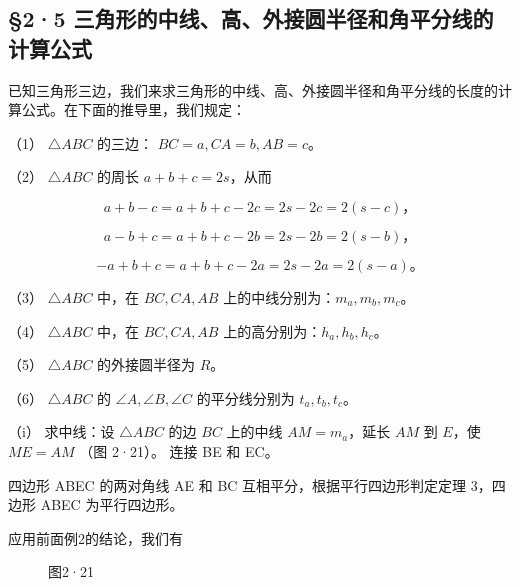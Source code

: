 \subsection{§2·5
三角形的中线、高、外接圆半径和角平分线的计算公式}

已知三角形三边，我们来求三角形的中线、高、外接圆半径和角平分线的长度的计算公式。在下面的推导里，我们规定：

（1） \(\triangle ABC\) 的三边： \(BC = a, CA = b, AB = c\)。

（2） \(\triangle ABC\) 的周长 \(a + b + c = 2s\)，从而

\[
a+b-c = a+b+c-2c = 2s-2c = 2(s-c)\text{，}
\]

\[
a-b+c = a+b+c-2b = 2s-2b = 2(s-b)\text{，}
\]

\[
-a+b+c = a+b+c-2a = 2s-2a = 2(s-a)\text{。}
\]

（3） \(\triangle ABC\) 中，在 \(BC, CA, AB\)
上的中线分别为：\(m_a, m_b, m_c\)。

（4） \(\triangle ABC\) 中，在 \(BC, CA, AB\)
上的高分别为：\(h_a, h_b, h_c\)。

（5） \(\triangle ABC\) 的外接圆半径为 \(R\)。

（6） \(\triangle ABC\) 的 \(\angle A, \angle B, \angle C\)
的平分线分别为 \(t_a,t_b,t_c\)。

（i） 求中线：设 \(\triangle ABC\) 的边 \(BC\) 上的中线
\(AM = m_a\)，延长 \(AM\) 到 \(E\)，使 \(ME = AM\) （图 2·21）。 连接 BE
和 EC。

四边形 ABEC 的两对角线 AE 和 BC 互相平分，根据平行四边形判定定理
3，四边形 ABEC 为平行四边形。

应用前面例2的结论，我们有

\begin{figure}
\centering
{}
\caption{图2·21}
\end{figure}

